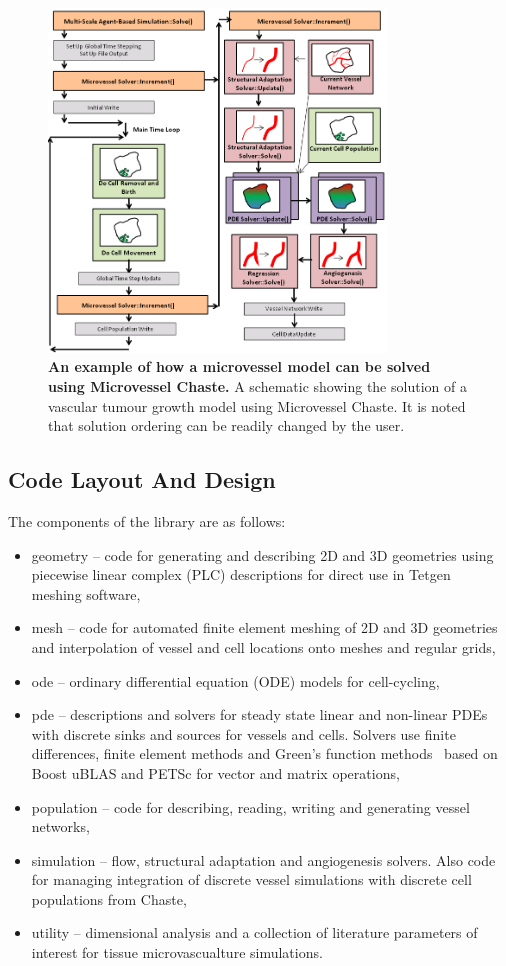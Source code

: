 \documentclass[10pt,letterpaper]{article}
\begin{document}
\begin{figure}[!h]
\centering
\includegraphics[width=0.8\textwidth]{Fig2.png}
\caption{{\bf An example of how a microvessel model can be solved using Microvessel Chaste.}
A schematic showing the solution of a vascular tumour growth model using Microvessel Chaste. It is noted that solution ordering can be readily changed by the user.}
\label{fig2}
\end{figure}

\subsection*{Code Layout And Design}

The components of the library are as follows:

\begin{itemize}
	\item geometry -- code for generating and describing 2D and 3D geometries using piecewise linear complex (PLC) descriptions for direct use in Tetgen~\cite{Si2015} meshing software,
	\item mesh -- code for automated finite element meshing of 2D and 3D geometries and interpolation of vessel and cell locations onto meshes and regular grids,
	\item ode -- ordinary differential equation (ODE) models for cell-cycling,
	\item pde -- descriptions and solvers for steady state linear and non-linear PDEs with discrete sinks and sources for vessels and cells. Solvers use finite differences, finite element methods and Green's function methods~\cite{Secomb2013} based on Boost uBLAS and PETSc for vector and matrix operations,
	\item population -- code for describing, reading, writing and generating vessel networks,
	\item simulation -- flow, structural adaptation and angiogenesis solvers. Also code for managing integration of discrete vessel simulations with discrete cell populations from Chaste,
	\item utility -- dimensional analysis and a collection of literature parameters of interest for tissue microvascualture simulations.	
\end{itemize}
\end{document}
